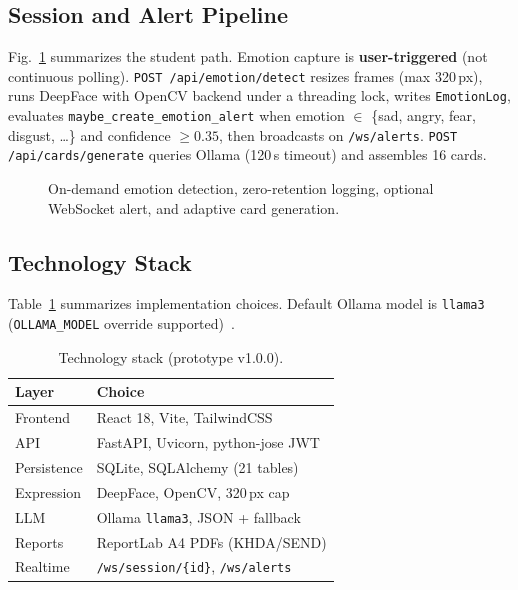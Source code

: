\documentclass[conference]{IEEEtran}
\begin{document}
\subsection{Session and Alert Pipeline}
Fig.~\ref{fig:pipe} summarizes the student path. Emotion capture is \textbf{user-triggered} (not continuous polling). \texttt{POST /api/emotion/detect} resizes frames (max 320\,px), runs DeepFace with OpenCV backend under a threading lock, writes \texttt{EmotionLog}, evaluates \texttt{maybe\_create\_emotion\_alert} when emotion $\in$ \{sad, angry, fear, disgust, \ldots\} and confidence $\geq 0.35$, then broadcasts on \texttt{/ws/alerts}. \texttt{POST /api/cards/generate} queries Ollama (120\,s timeout) and assembles 16 cards.

\begin{figure}[!t]
\centering
{}
\caption{On-demand emotion detection, zero-retention logging, optional WebSocket alert, and adaptive card generation.}
\label{fig:pipe}
\end{figure}

\subsection{Technology Stack}
Table~\ref{tab:stack} summarizes implementation choices. Default Ollama model is \texttt{llama3} (\texttt{OLLAMA\_MODEL} override supported)~\cite{ollama2024,meta2024}.

\begin{table}[!t]
\centering
\caption{Technology stack (prototype v1.0.0).}
\label{tab:stack}
\small
\begin{tabular}{@{}ll@{}}
\toprule
\textbf{Layer} & \textbf{Choice} \\
\midrule
Frontend & React 18, Vite, TailwindCSS \\
API & FastAPI, Uvicorn, python-jose JWT \\
Persistence & SQLite, SQLAlchemy (21 tables) \\
Expression & DeepFace, OpenCV, 320\,px cap \\
LLM & Ollama \texttt{llama3}, JSON + fallback \\
Reports & ReportLab A4 PDFs (KHDA/SEND) \\
Realtime & \texttt{/ws/session/\{id\}}, \texttt{/ws/alerts} \\
\bottomrule
\end{tabular}
\end{table}
\end{document}
